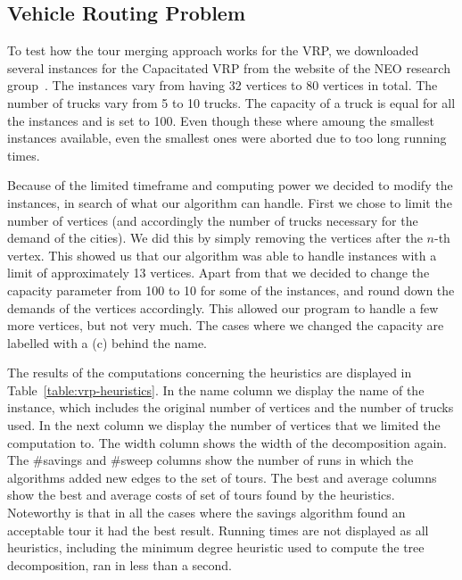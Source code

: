 \documentclass[titlepage, 12pt]{article}
\begin{document}
    \subsection{Vehicle Routing Problem}
    To test how the tour merging approach works for the VRP, we downloaded several instances
    for the Capacitated VRP from the website of the NEO research group~\cite{vrp-instances}.
    The instances vary from having 32 vertices to 80 vertices in total. The number of trucks vary
    from 5 to 10 trucks. The capacity of a truck is equal for all the instances and is set to 100.
    Even though these where amoung the smallest instances available, even the smallest ones were
    aborted due to too long running times.

    Because of the limited timeframe and computing power we decided to modify the instances, in
    search of what our algorithm can handle.
    First we chose to limit the number of vertices (and accordingly the number of trucks
    necessary for the demand of the cities). We did this by simply removing the vertices after the
    $n$-th vertex. This showed us that our algorithm was able to handle instances with a limit of
    approximately 13 vertices.
    Apart from that we decided to change the capacity parameter from 100 to 10 for some of the
    instances, and round down the demands of the vertices accordingly. This allowed our program to
    handle a few more vertices, but not very much. The cases where we changed the capacity are
    labelled with a (c) behind the name.

    The results of the computations concerning the heuristics are displayed in
    Table~\ref{table:vrp-heuristics}. In the name column we display the name of the instance, which
    includes the original number of vertices and the number of trucks used. In the next column we
    display the number of vertices that we limited the computation to. The width column shows the
    width of the decomposition again. The \#savings and \#sweep columns show the number of runs in
    which the algorithms added new edges to the set of tours. The best and average columns show the
    best and average costs of set of tours found by the heuristics. Noteworthy is that in all the
    cases where the savings algorithm found an acceptable tour it had the best result.
    Running times are not displayed as all heuristics, including the minimum degree heuristic used
    to compute the tree decomposition, ran in less than a second.
\end{document}
